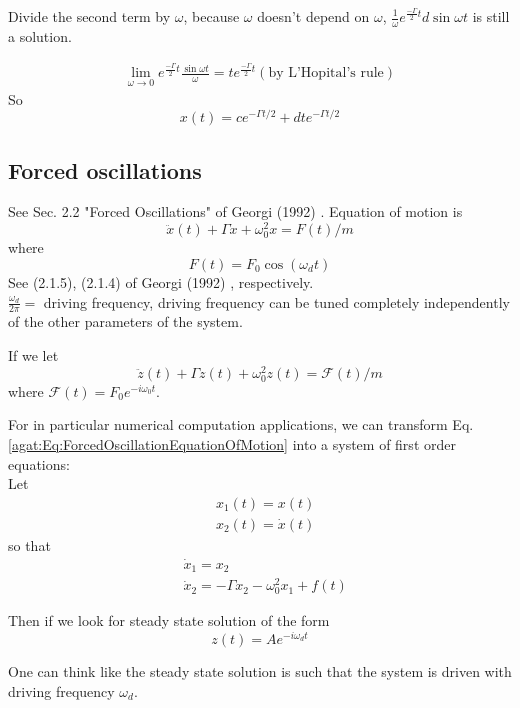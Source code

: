 Divide the second term by $\omega$, because $\omega$ doesn't depend on $\omega$, $\frac{1}{\omega} e^{\frac{-\Gamma}{2} t} d\sin{\omega t}$ is still a solution.

\[
\begin{gathered}
	\lim_{\omega \to 0} e^{ \frac{-\Gamma}{2} t} \frac{ \sin{ \omega t} }{\omega} = te^{\frac{-\Gamma}{2} t} (\text{by L'Hopital's rule})
\end{gathered}
\]
So
\[
x(t) = ce^{ - \Gamma t/2} + dte^{-\Gamma t/2}
\]

\subsection{Forced oscillations} See Sec. 2.2 "Forced Oscillations" of Georgi (1992) \cite{agat:Geor1992}.
Equation of motion is
\begin{equation}\label{agat:Eq:ForcedOscillationEquationOfMotion}
	\ddot{x}(t) + \Gamma \dot{x} + \omega_0^2 x = F(t) /m 
\end{equation}
where
\begin{equation}
	F(t) = F_0 \cos{(\omega_dt)}
\end{equation}
See (2.1.5), (2.1.4) of Georgi (1992) \cite{agat:Geor1992}, respectively. \\

$\frac{\omega_d}{2\pi} = $ driving frequency, driving frequency can be tuned completely independently of the other parameters of the system.

If we let 
\[
\ddot{z}(t) + \Gamma \dot{z}(t) + \omega_0^2 z(t) = \mathcal{F}(t) /m
\]
where $\mathcal{F}(t) = F_0 e^{-i \omega_0 t}$.

For in particular numerical computation applications, we can transform Eq. \ref{agat:Eq:ForcedOscillationEquationOfMotion} into a system of first order equations: \\
Let 
\[
\begin{aligned}
	& x_1(t) = x(t) \\
	& x_2(t) = \dot{x}(t)
\end{aligned}
\]
so that
\[
\begin{aligned}
	& \dot{x}_1 = x_2 \\
	& \dot{x}_2 = -\Gamma x_2 - \omega_0^2 x_1 + f(t)
\end{aligned}
\]

Then if we look for steady state solution of the form
\[
z(t) = A e^{-i \omega_d t}
\]

One can think like the steady state solution is such that the system is driven with driving frequency $\omega_d$.

